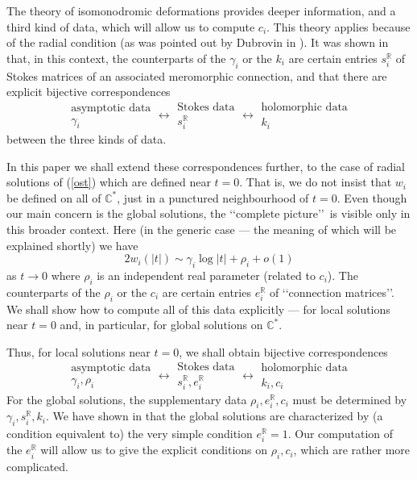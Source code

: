 \documentclass[a4paper,12pt,leqno]{amsart}
\numberwithin{equation}{section}
\theoremstyle{plain}
\theoremstyle{definition}
\newcommand{\C}{\mathbb C}
\newcommand{\R}{\mathbb R}
\newcommand{\ga}{\gamma}
\renewcommand{\ll}{\lq\lq}
\newcommand{\rr}{\rq\rq\ }
\newcommand{\rrr}{\rq\rq}
\begin{document}
The theory of isomonodromic deformations provides deeper information, and a third kind of data, which will allow us to compute $c_i$.  This theory applies because of the radial condition (as was pointed out by Dubrovin in  \cite{Du93}).  It was shown in \cite{GuItLiXX} that, in this context, the counterparts of the $\ga_i$ or the $k_i$ are certain entries $s^\R_i$ of Stokes matrices of an associated meromorphic connection, and that there are explicit bijective correspondences
\[
\boxed{
\begin{matrix}
\text{asymptotic data}    
\\
\ga_i
\end{matrix}
}
\longleftrightarrow
\boxed{
\begin{matrix}
\text{Stokes data}
\\
s^\R_i
\end{matrix}
}
\longleftrightarrow
\boxed{
\begin{matrix}
\text{holomorphic data}
\\
k_i
\end{matrix}
}
\]
between the three kinds of data.  

In this paper we shall extend these correspondences further, to the case of radial solutions of (\ref{ost}) which are defined near $t=0$.  That is, we do not insist that $w_i$ be defined on all of $\C^\ast$, just in a punctured neighbourhood of $t=0$. 
Even though our main concern is the global solutions, the \ll complete picture\rr is visible only in this broader context.    
Here (in the generic case --- the meaning of which will be explained shortly)
we have 
\[
2w_i(\vert t\vert)\sim\ga_i\log\vert t\vert + \rho_i + o(1)
\]
as $t\to 0$ where $\rho_i$ is an independent real parameter (related to $c_i$). The counterparts of the $\rho_i$ or the $c_i$ are certain entries $e^\R_i$  of \ll connection matrices\rrr.  We shall show how to compute all of this data explicitly --- for local solutions near $t=0$ and, in particular, for global solutions on $\C^\ast$.  

Thus, for local solutions near $t=0$, we shall obtain bijective correspondences
\[
\boxed{
\begin{matrix}
\text{asymptotic data}    
\\
\ga_i,\rho_i
\end{matrix}
}
\longleftrightarrow
\boxed{
\begin{matrix}
\text{Stokes data}
\\
s^\R_i,e^\R_i
\end{matrix}
}
\longleftrightarrow
\boxed{
\begin{matrix}
\text{holomorphic data}
\\
k_i,c_i
\end{matrix}
}
\]
For the global solutions, the supplementary data $\rho_i,e_i^\R,c_i$ must be determined by $\ga_i,s_i^\R,k_i$.  We have shown in \cite{GuItLi15} that the global solutions are characterized by (a condition equivalent to) the very simple condition $e_i^\R=1$.  Our computation of the $e_i^\R$ will allow us to
give the explicit conditions on $\rho_i,c_i$, which are rather more complicated.
\end{document}
